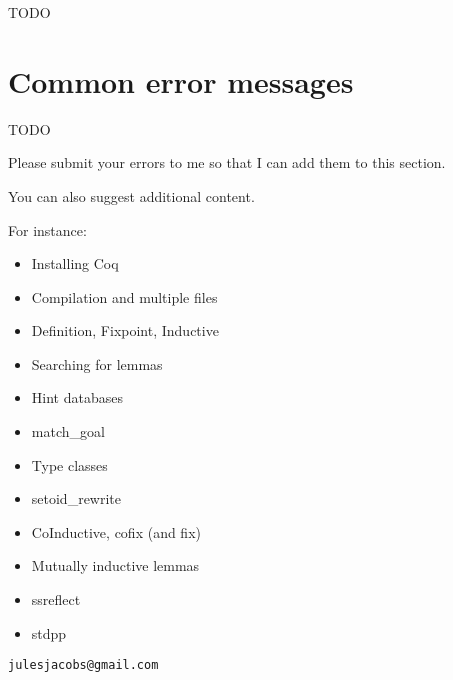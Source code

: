 TODO

\section{Common error messages}

TODO

Please submit your errors to me so that I can add them to this section.

You can also suggest additional content.

For instance:

\begin{itemize}
  \item Installing Coq
  \item Compilation and multiple files
  \item Definition, Fixpoint, Inductive
  \item Searching for lemmas
  \item Hint databases
  \item match\_goal
  \item Type classes
  \item setoid\_rewrite
  \item CoInductive, cofix (and fix)
  \item Mutually inductive lemmas
  \item ssreflect
  \item stdpp
\end{itemize}

\texttt{julesjacobs@gmail.com}







